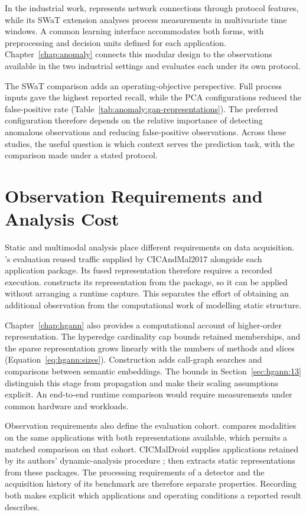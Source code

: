 In the industrial work, \nadics{} represents network connections through protocol features,
while its SWaT extension analyses process measurements in multivariate time windows. A common
learning interface accommodates both forms, with preprocessing and decision units defined for
each application. Chapter~\ref{chap:anomaly} connects this modular design to the observations
available in the two industrial settings and evaluates each under its own protocol.

The SWaT comparison adds an operating-objective perspective. Full process inputs gave the
highest reported recall, while the PCA configurations reduced the false-positive rate
(Table~\ref{tab:anomaly:gan-representations}). The preferred configuration therefore depends
on the relative importance of detecting anomalous observations and reducing false-positive
observations. Across these studies, the useful question is which context serves the
prediction task, with the comparison made under a stated protocol.

\section{Observation Requirements and Analysis Cost}
\label{sec:discussion:observation}
\label{sec:discussion:3}
\label{sec:discussion:5}

Static and multimodal analysis place different requirements on data acquisition.
\hybroid{}'s evaluation reused traffic supplied by CICAndMal2017 alongside each application
package. Its fused representation therefore requires a recorded execution. \hgann{}
constructs its representation from the package, so it can be applied without arranging a
runtime capture. This separates the effort of obtaining an additional observation from the
computational work of modelling static structure.

Chapter~\ref{chap:hgann} also provides a computational account of higher-order
representation. The hyperedge cardinality cap bounds retained memberships, and the sparse
representation grows linearly with the numbers of methods and slices
(Equation~\ref{eq:hgann:sizes}). Construction adds call-graph searches and comparisons
between semantic embeddings. The bounds in Section~\ref{sec:hgann:13} distinguish this
stage from propagation and make their scaling assumptions explicit. An end-to-end runtime
comparison would require measurements under common hardware and workloads.

Observation requirements also define the evaluation cohort. \hybroid{} compares modalities
on the same applications with both representations available, which permits a matched
comparison on that cohort. CICMalDroid supplies applications retained by its authors'
dynamic-analysis procedure \cite{mahdavifar2020dynamic}; \hgann{} then extracts static
representations from these packages. The processing requirements of a detector and the
acquisition history of its benchmark are therefore separate properties. Recording both
makes explicit which applications and operating conditions a reported result describes.

